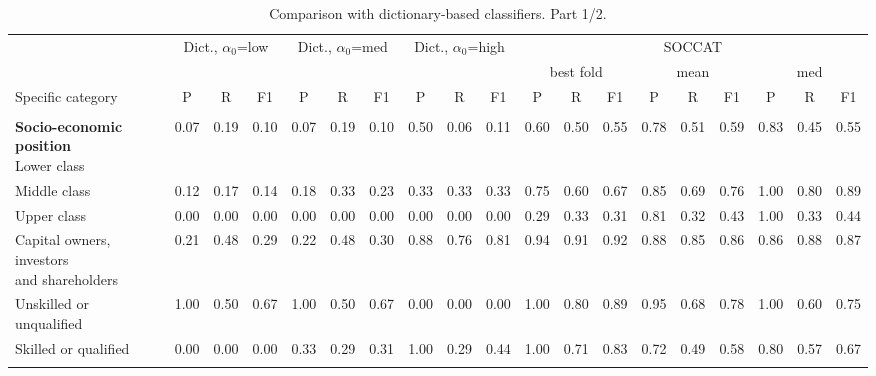 \begin{table}[htb]
\centering
\renewcommand{\arraystretch}{0.9}
\scriptsize
\begin{threeparttable}
\caption{Comparison with dictionary-based classifiers. Part 1/2.}
\label{tab:dictionary_alpha0_sweep_full_part1}
\begin{tabular}{l ccc ccc ccc ccc ccc ccc}
\toprule
 & \multicolumn{3}{c}{Dict., $\alpha_0$=low} & \multicolumn{3}{c}{Dict., $\alpha_0$=med} & \multicolumn{3}{c}{Dict., $\alpha_0$=high} & \multicolumn{9}{c}{SOCCAT} \\
\cmidrule(lr){2-4} \cmidrule(lr){5-7} \cmidrule(lr){8-10} \cmidrule(lr){11-19}
 & \multicolumn{3}{c}{} & \multicolumn{3}{c}{} & \multicolumn{3}{c}{} & \multicolumn{3}{c}{best fold} & \multicolumn{3}{c}{mean} & \multicolumn{3}{c}{med} \\
\cmidrule(lr){2-4} \cmidrule(lr){5-7} \cmidrule(lr){8-10} \cmidrule(lr){11-13} \cmidrule(lr){14-16} \cmidrule(lr){17-19}
Specific category & P & R & F1 & P & R & F1 & P & R & F1 & P & R & F1 & P & R & F1 & P & R & F1 \\
\midrule
\rule{0pt}{5pt} &  &  &  &  &  &  &  &  &  &  &  &  &  &  &  &  &  &  \\
\shortstack[l]{\textbf{Socio-economic position}\\[3pt]Lower class} & 0.07 & 0.19 & 0.10 & 0.07 & 0.19 & 0.10 & 0.50 & 0.06 & 0.11 & 0.60 & 0.50 & 0.55 & 0.78 & 0.51 & 0.59 & 0.83 & 0.45 & 0.55 \\
Middle class & 0.12 & 0.17 & 0.14 & 0.18 & 0.33 & 0.23 & 0.33 & 0.33 & 0.33 & 0.75 & 0.60 & 0.67 & 0.85 & 0.69 & 0.76 & 1.00 & 0.80 & 0.89 \\
Upper class & 0.00 & 0.00 & 0.00 & 0.00 & 0.00 & 0.00 & 0.00 & 0.00 & 0.00 & 0.29 & 0.33 & 0.31 & 0.81 & 0.32 & 0.43 & 1.00 & 0.33 & 0.44 \\
\shortstack[l]{Capital owners, investors\\[-3pt]and shareholders} & 0.21 & 0.48 & 0.29 & 0.22 & 0.48 & 0.30 & 0.88 & 0.76 & 0.81 & 0.94 & 0.91 & 0.92 & 0.88 & 0.85 & 0.86 & 0.86 & 0.88 & 0.87 \\
Unskilled or unqualified & 1.00 & 0.50 & 0.67 & 1.00 & 0.50 & 0.67 & 0.00 & 0.00 & 0.00 & 1.00 & 0.80 & 0.89 & 0.95 & 0.68 & 0.78 & 1.00 & 0.60 & 0.75 \\
Skilled or qualified & 0.00 & 0.00 & 0.00 & 0.33 & 0.29 & 0.31 & 1.00 & 0.29 & 0.44 & 1.00 & 0.71 & 0.83 & 0.72 & 0.49 & 0.58 & 0.80 & 0.57 & 0.67 \\
\rule{0pt}{5pt} &  &  &  &  &  &  &  &  &  &  &  &  &  &  &  &  &  &  \\

\end{tabular}
\end{threeparttable}
\end{table}
